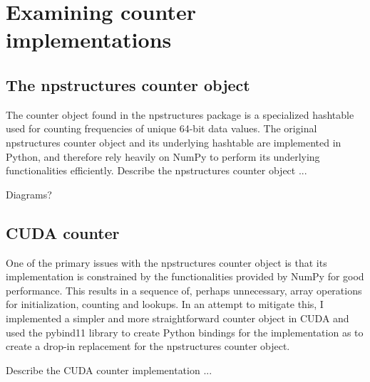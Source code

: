 \section{Examining counter implementations}
\subsection{The npstructures counter object}
The counter object found in the npstructures package is a specialized hashtable used for counting frequencies of unique 64-bit data values.
The original npstructures counter object and its underlying hashtable are implemented in Python, and therefore rely heavily on NumPy to perform its underlying functionalities efficiently.
Describe the npstructures counter object ...

Diagrams?

\subsection{CUDA counter}
One of the primary issues with the npstructures counter object is that its implementation is constrained by the functionalities provided by NumPy for good performance.
This results in a sequence of, perhaps unnecessary, array operations for initialization, counting and lookups.
In an attempt to mitigate this, I implemented a simpler and more straightforward counter object in CUDA and used the pybind11 library to create Python bindings for the implementation as to create a drop-in replacement for the npstructures counter object.

Describe the CUDA counter implementation ...





